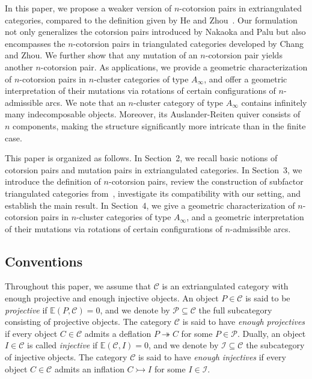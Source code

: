 \documentclass[a4paper,reqno,11pt]{amsart}
\theoremstyle{definition}
\begin{document}
In this paper, we propose a weaker version of $n$-cotorsion pairs in extriangulated categories, compared to the definition given by He and Zhou~\cite{HZ}. Our formulation not only generalizes the cotorsion pairs introduced by Nakaoka and Palu but also encompasses the $n$-cotorsion pairs in triangulated categories developed by Chang and Zhou. We further show that any mutation of an $n$-cotorsion pair yields another $n$-cotorsion pair.
As applications, we provide a geometric characterization of $n$-cotorsion pairs in $n$-cluster categories of type $A_{\infty}$, and offer a geometric interpretation of their mutations via rotations of certain configurations of $n$-admissible arcs.
We note that an $n$-cluster category of type $A_{\infty}$ contains infinitely many indecomposable objects. Moreover, its Auslander-Reiten quiver consists of $n$ components, making the structure significantly more intricate than in the finite case.


This paper is organized as follows. In Section~2, we recall basic notions of cotorsion pairs and mutation pairs in extriangulated categories. In Section~3, we introduce the definition of $n$-cotorsion pairs, review the construction of subfactor triangulated categories from~\cite{ZZ1}, investigate its compatibility with our setting, and establish the main result. In Section~4, we give a geometric characterization of $n$-cotorsion pairs in $n$-cluster categories of type $A_{\infty}$, and a geometric interpretation of their mutations via rotations of certain configurations of $n$-admissible arcs.


\subsection*{Conventions}
Throughout this paper, we assume that $\mathcal{C}$ is an extriangulated category with enough projective and enough injective objects. An object $P \in \mathcal{C}$ is said to be \emph{projective} if $\mathbb{E}(P, \mathcal{C}) = 0$, and we denote by $\mathcal{P} \subseteq \mathcal{C}$ the full subcategory consisting of projective objects. The category $\mathcal{C}$ is said to have \emph{enough projectives} if every object $C \in \mathcal{C}$ admits a deflation $P \twoheadrightarrow C$ for some $P \in \mathcal{P}$.
Dually, an object $I \in \mathcal{C}$ is called \emph{injective} if $\mathbb{E}(\mathcal{C}, I) = 0$, and we denote by $\mathcal{I} \subseteq \mathcal{C}$ the subcategory of injective objects. The category $\mathcal{C}$ is said to have \emph{enough injectives} if every object $C \in \mathcal{C}$ admits an inflation $C \rightarrowtail I$ for some $I \in \mathcal{I}$.
\end{document}
